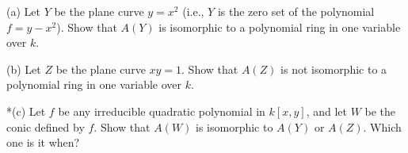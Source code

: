 (a) Let $Y$ be the plane curve $y = x^2$ (i.e., $Y$ is the zero set of the polynomial $f = y - x^2$). Show that $A(Y)$ is isomorphic to a polynomial ring in one variable over $k$.

(b) Let $Z$ be the plane curve $xy = 1$. Show that $A(Z)$ is not isomorphic to a polynomial ring in one variable over $k$.

*(c) Let $f$ be any irreducible quadratic polynomial in $k[x, y]$, and let $W$ be the conic defined by $f$. Show that $A(W)$ is isomorphic to $A(Y)$ or $A(Z)$. Which one is it when?